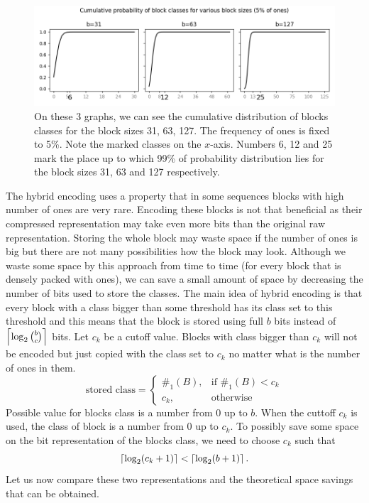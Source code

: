 \begin{figure}
	\centerline{
		\includegraphics[width=\textwidth]{images/hybrid_encoding_motivation}
	}
	\caption[TODO]{On these 3 graphs, we can see the cumulative distribution
    of blocks classes for the block sizes 31, 63, 127. The frequency of ones is
    fixed to 5\%. Note the marked classes on the $x$-axis. Numbers 6, 12 and
    25 mark the place up to which 99\% of probability distribution lies for
    the block sizes 31, 63 and 127 respectively.
	}
	\label{obr:hybridEncodingDistribution}
\end{figure}

The hybrid encoding uses a property that in some sequences blocks with high number
of ones are very rare. Encoding these blocks is not that beneficial as their
compressed representation may take even more bits than the original raw
representation. Storing the whole block may waste space if the number of
ones is big but there are not many possibilities how the block may look.
Although we waste some space by this approach from time to time (for every
block that is densely packed with ones), we can save a small amount of space
by decreasing the number of bits used to store the classes. The main idea
of hybrid encoding is that every block with a class bigger than some threshold
has its class set to this threshold and this means that the block
is stored using full $b$ bits instead of $\left\lceil \log_2{b\choose c} \right\rceil$ bits.
Let $c_k$ be a cutoff value. Blocks with class bigger than $c_k$ will not be
encoded but just copied with the class set to $c_k$ no matter what is the
number of ones in them.
\[
    \text{stored class} = 
\begin{cases}
    \#_1(B),& \text{if } \#_1(B) < c_k\\
    c_k,              & \text{otherwise}
\end{cases}
\]
Possible value for blocks class is a number from 0 up to $b$. When the cuttoff $c_k$ is
used, the class of block is a number from 0 up to $c_k$. To possibly save some space on
the bit representation of the blocks class, we need to choose $c_k$ such that
$$\left\lceil \log_2(c_k+1) \right\rceil < \left\lceil \log_2(b+1) \right\rceil.$$ Let us now compare these two representations
and the theoretical space savings that can be obtained.

